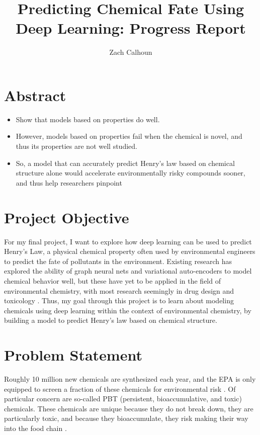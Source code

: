\documentclass[12pt, oneside]{article}   	%
\title{Predicting Chemical Fate Using Deep Learning: Progress Report}
\author{Zach Calhoun}
\begin{document}
\maketitle

\section{Abstract}


\begin{itemize}
	\item Show that models based on properties do well.
	\item However, models based on properties fail when the chemical is novel, and thus its properties are not well studied.
	\item So, a model that can accurately predict Henry's law based on chemical structure alone would accelerate environmentally risky compounds sooner, and thus help researchers pinpoint 
\end{itemize}

\section{Project Objective}
For my final project, I want to explore how deep learning can be used to predict Henry's Law, a physical chemical property often used by environmental engineers to predict the fate of pollutants in the environment. Existing research has explored the ability of graph neural nets and variational auto-encoders to model chemical behavior well, but these have yet to be applied in the field of environmental chemistry, with most research seemingly in drug design and toxicology \cite{RN106}. Thus, my goal through this project is to learn about modeling chemicals using deep learning within the context of environmental chemistry, by building a model to predict Henry's law based on chemical structure.

\section{Problem Statement}
Roughly 10 million new chemicals are synthesized each year, and the EPA is only equipped to screen a fraction of these chemicals for environmental risk \cite{burton}. Of particular concern are so-called PBT (persistent, bioaccumulative, and toxic) chemicals. These chemicals are unique because they do not break down, they are particularly toxic, and because they bioaccumulate, they risk making their way into the food chain \cite{matthies}.
\end{document}
